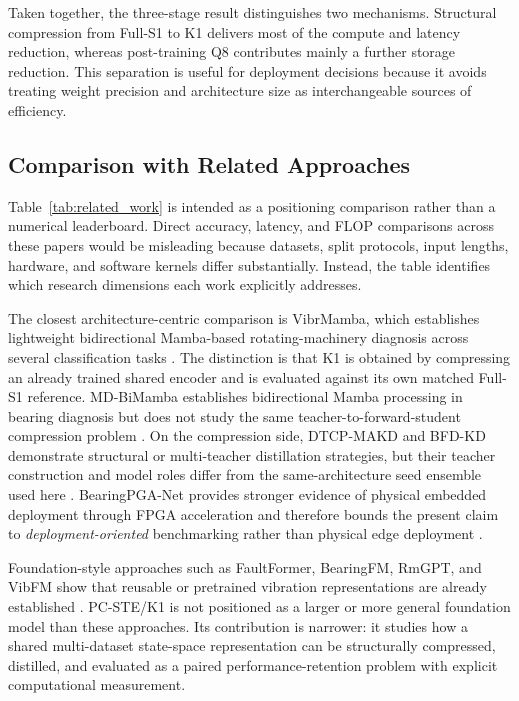 Taken together, the three-stage result distinguishes two mechanisms. Structural compression from Full-S1 to K1 delivers most of the compute and latency reduction, whereas post-training Q8 contributes mainly a further storage reduction. This separation is useful for deployment decisions because it avoids treating weight precision and architecture size as interchangeable sources of efficiency.

\subsection{Comparison with Related Approaches}
\label{subsec:comparison}



Table~\ref{tab:related_work} is intended as a positioning comparison rather than a numerical leaderboard. Direct accuracy, latency, and FLOP comparisons across these papers would be misleading because datasets, split protocols, input lengths, hardware, and software kernels differ substantially. Instead, the table identifies which research dimensions each work explicitly addresses.

The closest architecture-centric comparison is VibrMamba, which establishes lightweight bidirectional Mamba-based rotating-machinery diagnosis across several classification tasks \citep{Yi2025VibrMamba}. The distinction is that K1 is obtained by compressing an already trained shared encoder and is evaluated against its own matched Full-S1 reference. MD-BiMamba establishes bidirectional Mamba processing in bearing diagnosis but does not study the same teacher-to-forward-student compression problem \citep{Wang2025MDBiMamba}. On the compression side, DTCP-MAKD and BFD-KD demonstrate structural or multi-teacher distillation strategies, but their teacher construction and model roles differ from the same-architecture seed ensemble used here \citep{Zhong2024DTCPMAKD,Sun2026BFDKD}. BearingPGA-Net provides stronger evidence of physical embedded deployment through FPGA acceleration and therefore bounds the present claim to \emph{deployment-oriented} benchmarking rather than physical edge deployment \citep{Liao2024BearingPGANet}.

Foundation-style approaches such as FaultFormer, BearingFM, RmGPT, and VibFM show that reusable or pretrained vibration representations are already established \citep{Zhou2024FaultFormer,Lai2024BearingFM,Wang2025RmGPT,Mannone2026VibFM}. PC-STE/K1 is not positioned as a larger or more general foundation model than these approaches. Its contribution is narrower: it studies how a shared multi-dataset state-space representation can be structurally compressed, distilled, and evaluated as a paired performance-retention problem with explicit computational measurement.

